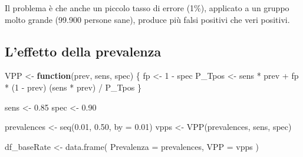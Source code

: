 \documentclass[
  italian,
  letterpaper,
  a4paper,
  11pt,
  open=any]{scrbook}
\newenvironment{Shaded}{\begin{snugshade}}{\end{snugshade}}
\newcommand{\AttributeTok}[1]{\textcolor[rgb]{0.40,0.45,0.13}{#1}}
\newcommand{\ControlFlowTok}[1]{\textcolor[rgb]{0.00,0.23,0.31}{\textbf{#1}}}
\newcommand{\DecValTok}[1]{\textcolor[rgb]{0.68,0.00,0.00}{#1}}
\newcommand{\FloatTok}[1]{\textcolor[rgb]{0.68,0.00,0.00}{#1}}
\newcommand{\FunctionTok}[1]{\textcolor[rgb]{0.28,0.35,0.67}{#1}}
\newcommand{\NormalTok}[1]{\textcolor[rgb]{0.00,0.23,0.31}{#1}}
\newcommand{\OtherTok}[1]{\textcolor[rgb]{0.00,0.23,0.31}{#1}}
\newcommand{\SpecialCharTok}[1]{\textcolor[rgb]{0.37,0.37,0.37}{#1}}
\theoremstyle{plain}
\theoremstyle{definition}
\theoremstyle{definition}
\theoremstyle{remark}
\begin{document}
Il problema è che anche un piccolo tasso di errore (1\%), applicato a un
gruppo molto grande (99.900 persone sane), produce più falsi positivi
che veri positivi.

\subsection{L'effetto della prevalenza}\label{leffetto-della-prevalenza}

\begin{Shaded}
\begin{Highlighting}[]
\NormalTok{VPP }\OtherTok{\textless{}{-}} \ControlFlowTok{function}\NormalTok{(prev, sens, spec) \{}
\NormalTok{  fp }\OtherTok{\textless{}{-}} \DecValTok{1} \SpecialCharTok{{-}}\NormalTok{ spec}
\NormalTok{  P\_Tpos }\OtherTok{\textless{}{-}}\NormalTok{ sens }\SpecialCharTok{*}\NormalTok{ prev }\SpecialCharTok{+}\NormalTok{ fp }\SpecialCharTok{*}\NormalTok{ (}\DecValTok{1} \SpecialCharTok{{-}}\NormalTok{ prev)}
\NormalTok{  (sens }\SpecialCharTok{*}\NormalTok{ prev) }\SpecialCharTok{/}\NormalTok{ P\_Tpos}
\NormalTok{\}}

\NormalTok{sens }\OtherTok{\textless{}{-}} \FloatTok{0.85}
\NormalTok{spec }\OtherTok{\textless{}{-}} \FloatTok{0.90}

\NormalTok{prevalences }\OtherTok{\textless{}{-}} \FunctionTok{seq}\NormalTok{(}\FloatTok{0.01}\NormalTok{, }\FloatTok{0.50}\NormalTok{, }\AttributeTok{by =} \FloatTok{0.01}\NormalTok{)}
\NormalTok{vpps }\OtherTok{\textless{}{-}} \FunctionTok{VPP}\NormalTok{(prevalences, sens, spec)}

\NormalTok{df\_baseRate }\OtherTok{\textless{}{-}} \FunctionTok{data.frame}\NormalTok{(}
  \AttributeTok{Prevalenza =}\NormalTok{ prevalences,}
  \AttributeTok{VPP =}\NormalTok{ vpps}
\NormalTok{)}


\end{Highlighting}
\end{Shaded}
\end{document}
